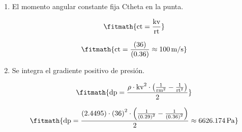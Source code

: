 \begin{enumerate}

\item El momento angular constante fija Ctheta en la punta.

\[\fitmath{\mathrm{ct}=\frac{\mathrm{kv}}{\mathrm{rt}}}\]

\[\fitmath{\mathrm{ct}=\frac{(36)}{(0.36)}\approx 100\,\mathrm{m/s}}\]

\item Se integra el gradiente positivo de presión.

\[\fitmath{\mathrm{dp}=\frac{\rho\cdot {\mathrm{kv}}^{2}\cdot \left(\frac{1}{{\mathrm{rm}}^{2}}-\frac{1}{{\mathrm{rt}}^{2}}\right)}{2}}\]

\[\fitmath{\mathrm{dp}=\frac{(2.4495)\cdot {(36)}^{2}\cdot \left(\frac{1}{{(0.29)}^{2}}-\frac{1}{{(0.36)}^{2}}\right)}{2}\approx 6626.174\,\mathrm{Pa}}\]

\end{enumerate}
